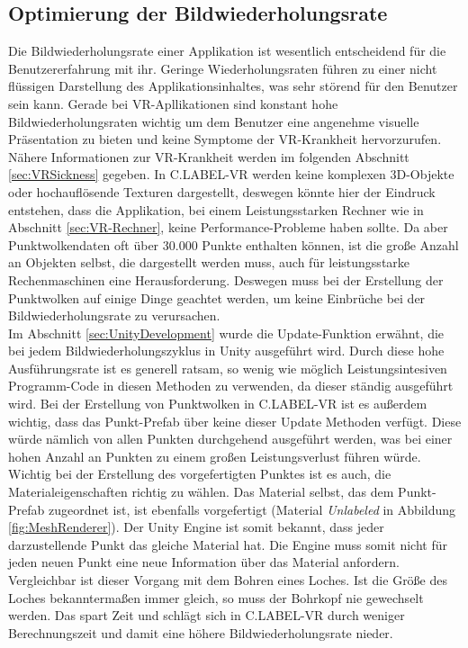 \subsection{Optimierung der Bildwiederholungsrate}
\label{sec:Optimierung}

Die Bildwiederholungsrate einer Applikation ist wesentlich entscheidend für die Benutzererfahrung mit ihr. Geringe Wiederholungsraten führen zu einer nicht flüssigen Darstellung des Applikationsinhaltes, was sehr störend für den Benutzer sein kann. Gerade bei VR-Apllikationen sind konstant hohe Bildwiederholungsraten wichtig um dem Benutzer eine angenehme visuelle Präsentation zu bieten und keine Symptome der VR-Krankheit hervorzurufen. Nähere Informationen zur VR-Krankheit werden im folgenden Abschnitt \ref{sec:VRSickness} gegeben. In C.LABEL-VR werden keine komplexen 3D-Objekte oder hochauflösende Texturen dargestellt, deswegen könnte hier der Eindruck entstehen, dass die Applikation, bei einem Leistungsstarken Rechner wie in Abschnitt \ref{sec:VR-Rechner}, keine Performance-Probleme haben sollte. Da aber Punktwolkendaten oft über 30.000 Punkte enthalten können, ist die große Anzahl an Objekten selbst, die dargestellt werden muss, auch für leistungsstarke Rechenmaschinen eine Herausforderung. Deswegen muss bei der Erstellung der Punktwolken auf einige Dinge geachtet werden, um keine Einbrüche bei der Bildwiederholungsrate zu verursachen.\\

Im Abschnitt \ref{sec:UnityDevelopment} wurde die Update-Funktion erwähnt, die bei jedem Bildwiederholungszyklus in Unity ausgeführt wird. Durch diese hohe Ausführungsrate ist es generell ratsam, so wenig wie möglich Leistungsintesiven Programm-Code in diesen Methoden zu verwenden, da dieser ständig ausgeführt wird. Bei der Erstellung von Punktwolken in C.LABEL-VR ist es außerdem wichtig, dass das Punkt-Prefab über keine dieser Update Methoden verfügt. Diese würde nämlich von allen Punkten durchgehend ausgeführt werden, was bei einer hohen Anzahl an Punkten zu einem großen Leistungsverlust führen würde.\\

Wichtig bei der Erstellung des vorgefertigten Punktes ist es auch, die Materialeigenschaften richtig zu wählen. Das Material selbst, das dem Punkt-Prefab zugeordnet ist, ist ebenfalls vorgefertigt (Material \textit{Unlabeled} in Abbildung \ref{fig:MeshRenderer}). Der Unity Engine ist somit bekannt, dass jeder darzustellende Punkt das gleiche Material hat. Die Engine muss somit nicht für jeden neuen Punkt eine neue Information über das Material anfordern. Vergleichbar ist dieser Vorgang mit dem Bohren eines Loches. Ist die Größe des Loches bekanntermaßen immer gleich, so muss der Bohrkopf nie gewechselt werden. Das spart Zeit und schlägt sich in C.LABEL-VR durch weniger Berechnungszeit und damit eine höhere Bildwiederholungsrate nieder.\\

